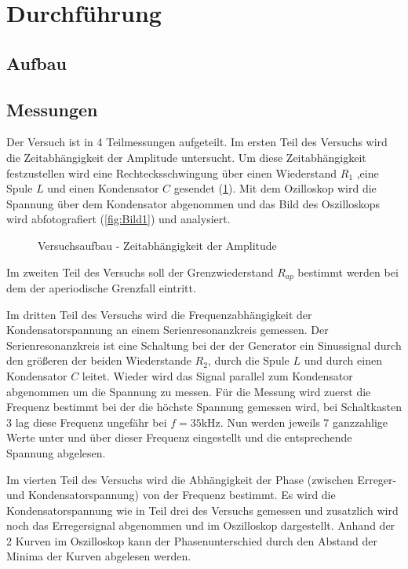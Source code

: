 \newpage
\section{Durchführung}
\label{sec:Durchfuehrung}
\subsection{Aufbau}
\subsection{Messungen}
Der Versuch ist in 4 Teilmessungen aufgeteilt.
Im ersten Teil des Versuchs wird die Zeitabhängigkeit der Amplitude untersucht.
Um diese Zeitabhängigkeit festzustellen wird eine Rechtecksschwingung über einen Wiederstand $R_1$ ,eine Spule $L$ und einen Kondensator $C$ gesendet (\ref{fig:Aufbau1}).
Mit dem Ozilloskop wird die Spannung über dem Kondensator abgenommen und das Bild des Oszilloskops wird abfotografiert (\ref{fig:Bild1}) und analysiert.
\begin{figure}
\caption{Versuchsaufbau - Zeitabhängigkeit der Amplitude}
\label{fig:Aufbau1}
\end{figure}

Im zweiten Teil des Versuchs soll der Grenzwiederstand $R_{ap}$ bestimmt werden bei dem der aperiodische Grenzfall eintritt.


Im dritten Teil des Versuchs wird die Frequenzabhängigkeit der Kondensatorspannung an einem Serienresonanzkreis gemessen.
Der Serienresonanzkreis ist eine Schaltung bei der  der Generator ein Sinussignal durch den größeren der beiden Wiederstande $R_2$, durch die Spule $L$ und durch einen Kondensator $C$ leitet.
Wieder wird das Signal parallel zum Kondensator abgenommen um die Spannung zu messen.
Für die Messung wird zuerst die Frequenz bestimmt bei der die höchste Spannung gemessen wird, bei Schaltkasten 3 lag diese Frequenz ungefähr bei $f = 35 \text{kHz}$.
Nun werden jeweils 7 ganzzahlige Werte unter und über dieser Frequenz eingestellt und die entsprechende Spannung abgelesen.

Im vierten Teil des Versuchs wird die Abhängigkeit der Phase (zwischen Erreger- und Kondensatorspannung) von der Frequenz bestimmt.
Es wird die Kondensatorspannung wie in Teil drei des Versuchs gemessen und zusatzlich wird noch das Erregersignal abgenommen und im Oszilloskop dargestellt.
Anhand der 2 Kurven im Oszilloskop kann der Phasenunterschied durch den Abstand der Minima der Kurven abgelesen werden.
